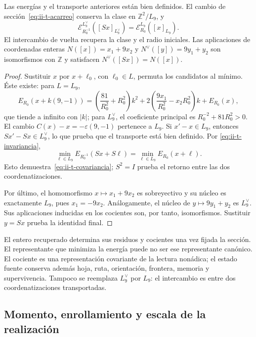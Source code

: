 \begin{theorem}
\label{thm:ii-t-cociente}
Las energías y el transporte anteriores están bien definidos. El cambio
de sección~\eqref{eq:ii-t-acarreo} conserva la clase en
\(\mathbb Z^2/L_9\), y
\begin{equation}
 \mathcal E_{R_0^{-1}}^{L_9^\vee}([Sx]_{L_9^\vee})
 =\mathcal E_{R_0}^{L_9}([x]_{L_9}).
 \label{eq:ii-t-covariancia}
\end{equation}
El intercambio de vuelta recupera la clase y el radio iniciales. Las
aplicaciones de coordenadas enteras \(N([x])=x_1+9x_2\) y
\(N^\vee([y])=9y_1+y_2\) son isomorfismos con \(\mathbb Z\)
y satisfacen \(N^\vee([Sx])=N([x])\).
\end{theorem}

\begin{proof}
Sustituir \(x\) por \(x+\ell_0\), con \(\ell_0\in L\),
permuta los candidatos al mínimo. Éste existe: para \(L=L_9\),
\[
 E_{R_0}(x+k(9,-1))
 =\left(\frac{81}{R_0^2}+R_0^2\right)k^2
  +2\left(\frac{9x_1}{R_0^2}-x_2R_0^2\right)k+E_{R_0}(x),
\]
que tiende a infinito con \(|k|\); para \(L_9^\vee\), el
coeficiente principal es \(R_0^{-2}+81R_0^2>0\). El cambio
\(C(x)-x=-\varepsilon(9,-1)\) pertenece a \(L_9\).
Si \(x'-x\in L_9\), entonces \(Sx'-Sx\in L_9^\vee\),
lo que prueba que el transporte está bien definido. Por
\eqref{eq:ii-t-invariancia},
\[
 \min_{\ell\in L_9}E_{R_0^{-1}}(Sx+S\ell)
 =\min_{\ell\in L_9}E_{R_0}(x+\ell).
\]
Esto demuestra~\eqref{eq:ii-t-covariancia}; \(S^2=I\) prueba
el retorno entre las dos coordenatizaciones.

Por último, el homomorfismo \(x\mapsto x_1+9x_2\) es
sobreyectivo y su núcleo es exactamente \(L_9\), pues
\(x_1=-9x_2\). Análogamente, el núcleo de
\(y\mapsto9y_1+y_2\) es \(L_9^\vee\). Sus aplicaciones
inducidas en los cocientes son, por tanto, isomorfismos. Sustituir
\(y=Sx\) prueba la identidad final.
\end{proof}

El entero recuperado determina sus residuos y cocientes una vez fijada
la sección. El representante que minimiza la energía puede no ser ese
representante canónico. El cociente es una representación covariante de la
lectura nonádica; el estado fuente conserva además hoja, ruta, orientación,
frontera, memoria y supervivencia. Tampoco se reemplaza \(L_9^\vee\)
por \(L_9\): el intercambio es entre dos coordenatizaciones transportadas.

\subsection{Momento, enrollamiento y escala de la realización}

